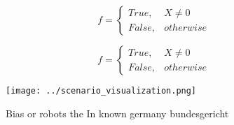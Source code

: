 \documentclass[a4paper]{article}
\begin{document}
\begin{equation}   f =
\begin{cases} True, & X \neq 0\\
False, & otherwise
\end{cases}
\end{equation}

\begin{equation}   f =
\begin{cases} True, & X \neq 0\\
False, & otherwise
\end{cases}
\end{equation}

\begin{figure}
\centering
\texttt{[image: ../scenario\_visualization.png]}
\caption{Bias or robots the In known germany bundesgericht
}
\end{figure}
 
\end{document}
